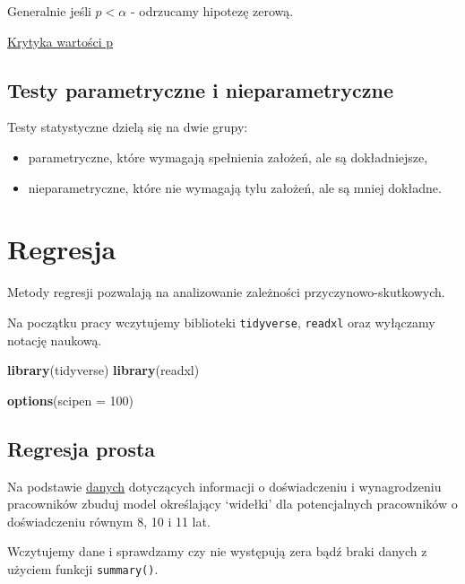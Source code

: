 \documentclass[]{book}
\newenvironment{Shaded}{\begin{snugshade}}{\end{snugshade}}
\newcommand{\KeywordTok}[1]{\textcolor[rgb]{0.13,0.29,0.53}{\textbf{#1}}}
\newcommand{\DataTypeTok}[1]{\textcolor[rgb]{0.13,0.29,0.53}{#1}}
\newcommand{\DecValTok}[1]{\textcolor[rgb]{0.00,0.00,0.81}{#1}}
\newcommand{\NormalTok}[1]{#1}
\providecommand{\tightlist}{%
  \setlength{\itemsep}{0pt}\setlength{\parskip}{0pt}}
\begin{document}
Generalnie jeśli \(p < \alpha\) - odrzucamy hipotezę zerową.

\href{http://idane.pl/blog/asa}{Krytyka wartości p}

\section{Testy parametryczne i
nieparametryczne}\label{testy-parametryczne-i-nieparametryczne}

Testy statystyczne dzielą się na dwie grupy:

\begin{itemize}
\tightlist
\item
  parametryczne, które wymagają spełnienia założeń, ale są
  dokładniejsze,
\item
  nieparametryczne, które nie wymagają tylu założeń, ale są mniej
  dokładne.
\end{itemize}

\chapter{Regresja}\label{regresja}

Metody regresji pozwalają na analizowanie zależności
przyczynowo-skutkowych.

Na początku pracy wczytujemy biblioteki \texttt{tidyverse},
\texttt{readxl} oraz wyłączamy notację naukową.

\begin{Shaded}
\begin{Highlighting}[]
\KeywordTok{library}\NormalTok{(tidyverse)}
\KeywordTok{library}\NormalTok{(readxl)}

\KeywordTok{options}\NormalTok{(}\DataTypeTok{scipen =} \DecValTok{100}\NormalTok{)}
\end{Highlighting}
\end{Shaded}

\section{Regresja prosta}\label{regresja-prosta}

Na podstawie \href{data/Salary_Data.csv}{danych} dotyczących informacji
o doświadczeniu i wynagrodzeniu pracowników zbuduj model określający
`widełki' dla potencjalnych pracowników o doświadczeniu równym 8, 10 i
11 lat.

Wczytujemy dane i sprawdzamy czy nie występują zera bądź braki danych z
użyciem funkcji \texttt{summary()}.
\end{document}
